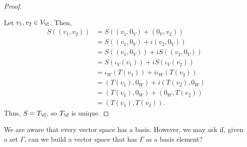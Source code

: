 \documentclass[10pt]{mypackage}
\begin{document}
\begin{proof}
\begin{center}
\end{center}
Let $v_1,v_2\in V_{\C}$. Then,
\begin{align*}
  S\left(\left(v_1,v_2\right)\right) &= S\left(\left(v_1,0_V\right) + \left(0_V,v_2\right)\right)\\
                                     &= S\left(\left(v_1,0_V\right) + i\left(v_2,0_V\right)\right)\\
                                     &= S\left(\left(v_1,0_V\right)\right) + iS\left(\left(v_2,0_V\right)\right)\\
                                     &= S\left(\iota_V\left(v_1\right)\right) + iS\left(\iota_V\left(v_2\right)\right)\\
                                     &= \iota_W\left(T\left(v_1\right)\right) + i\iota_W\left(T\left(v_2\right)\right)\\
                                     &= \left(T\left(v_1\right),0_W\right) + i\left(T\left(v_2\right),0_W\right)\\
                                     &= \left(T\left(v_1\right),0_W\right) + \left(0_W,T\left(v_2\right)\right)\\
                                     &= \left(T\left(v_1\right),T\left(v_2\right)\right).
\end{align*}
Thus, $S = T_{\C}$, so $T_{\C}$ is unique.
\end{proof}
We are aware that every vector space has a basis. However, we may ask if, given a set $\Gamma$, can we build a vector space that has $\Gamma$ as a basis element?\newline
\end{document}
